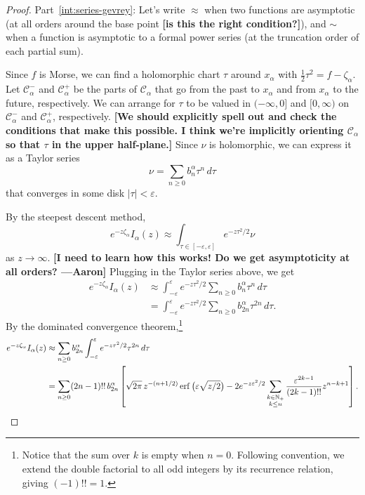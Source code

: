 \documentclass[11pt,a4paper,twoside,leqno,noamsfonts]{amsart}
\numberwithin{equation}{section}
\begin{document}
\begin{proof}
Part~\eqref{int:series-gevrey}: Let's write $\approx$ when two functions are asymptotic (at all orders around the base point \textbf{[is this the right condition?]}), and $\sim$ when a function is asymptotic to a formal power series (at the truncation order of each partial sum).

Since $f$ is Morse, we can find a holomorphic chart $\tau$ around $x_\alpha$ with $\tfrac{1}{2} \tau^2 = f - \zeta_\alpha$. Let $\mathcal{C}^-_\alpha$ and $\mathcal{C}^+_\alpha$ be the parts of $\mathcal{C}_\alpha$ that go from the past to $x_\alpha$ and from $x_\alpha$ to the future, respectively. We can arrange for $\tau$ to be valued in $(-\infty, 0]$ and $[0, \infty)$ on $\mathcal{C}^-_\alpha$ and $\mathcal{C}^+_\alpha$, respectively. \textbf{[We should explicitly spell out and check the conditions that make this possible. I think we're implicitly orienting $\mathcal{C}_\alpha$ so that $\tau$ in the upper half-plane.]} Since $\nu$ is holomorphic, we can express it as a Taylor series
\[ \nu = \sum_{n \ge 0} b_n^\alpha \tau^n\,d\tau \]
that converges in some disk $|\tau| < \varepsilon$.

By the steepest descent method,
\[ e^{-z\zeta_\alpha} I_\alpha(z) \approx \int_{\tau \in [-\varepsilon, \varepsilon]} e^{-z\tau^2/2} \nu \]
as $z \to \infty$. \textbf{[I need to learn how this works! Do we get asymptoticity at all orders? ---Aaron]} Plugging in the Taylor series above, we get
\begin{align*}
e^{-z\zeta_\alpha} I_\alpha(z) & \approx \int_{-\varepsilon}^\varepsilon e^{-z\tau^2/2} \sum_{n \ge 0} b_n^\alpha \tau^n\,d\tau \\
& = \int_{-\varepsilon}^\varepsilon e^{-z\tau^2/2} \sum_{n \ge 0} b_{2n}^\alpha \tau^{2n}\,d\tau.
\end{align*}
By the dominated convergence theorem,\footnote{Notice that the sum over $k$ is empty when $n = 0$. Following convention, we extend the double factorial to all odd integers by its recurrence relation, giving $(-1)!! = 1$.}
\begin{align*}
e^{-z\zeta_\alpha} I_\alpha(z) & \approx \sum_{n \ge 0} b_{2n}^\alpha \int_{-\varepsilon}^\varepsilon e^{-z\tau^2/2} \tau^{2n}\,d\tau \\
& = \sum_{n \ge 0} (2n-1)!!\,b_{2n}^\alpha \left[ \sqrt{2\pi}\,z^{-(n+1/2)} \operatorname{erf}\big(\varepsilon \sqrt{z/2}\big) - 2e^{-z\varepsilon^2/2} \sum_{\substack{k \in \mathbb N_+ \\ k \le n}} \frac{\varepsilon^{2k-1}}{(2k-1)!!} z^{n-k+1} \right].
\end{align*}


\end{proof}
\end{document}
